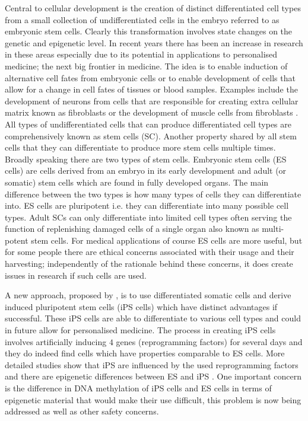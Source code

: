 Central to cellular development is the creation of distinct differentiated cell types from a small collection of undifferentiated cells in the embryo referred to as embryonic stem cells. Clearly this transformation involves state changes on the genetic and epigenetic level. In recent years there has been an increase in research in these areas especially due to its potential in applications to personalised medicine; the next big frontier in medicine. The idea is to enable induction of alternative cell fates from embryonic cells or to enable development of cells that allow for a change in cell fates of tissues or blood samples. Examples include the development of neurons from cells that are responsible for creating extra cellular matrix known as fibroblasts \citep{Vierbuchen:2010fa, Pang:2011ce} or the development of muscle cells from fibroblasts \citep{Ieda:2010ir, Efe:2011bpa}. All types of undifferentiated cells that can produce differentiated cell types are comprehensively known as stem cells (SC). Another property shared by all stem cells that they can differentiate to produce more stem cells multiple times. Broadly speaking there are two types of stem cells. Embryonic stem cells (ES cells) are cells derived from an embryo in its early development and  adult (or somatic) stem cells which are found in fully developed organs. The main difference between the two types is how many types of cells they can differentiate into. ES cells are pluripotent i.e. they can differentiate into many possible cell types. Adult SCs can only differentiate into limited cell types often serving the function of replenishing damaged cells of a single organ also known as multi-potent stem cells. For medical applications of course ES cells are more useful, but for some people there are ethical concerns associated with their usage and their harvesting; independently of the rationale behind these concerns, it does create issues in research if such cells are used.

A new approach, proposed by \cite{Takahashi:2006hi}, is to use differentiated somatic cells and derive induced pluripotent stem cells (iPS cells) which have distinct advantages if successful. These iPS cells are able to differentiate to various cell types and could in future allow for personalised medicine. The process in creating iPS cells involves artificially inducing $4$ genes (reprogramming factors) for several days and they do indeed find cells which have properties comparable to ES cells. More detailed studies show that iPS are influenced by the used reprogramming factors and there are epigenetic differences between ES and iPS \citep{Carey:2011bs, Bock:2011kx}. One important concern is the difference in DNA methylation of iPS cells and ES cells in terms of epigenetic material that would make their use difficult, this problem is now being addressed \citep{Bagci:2013ey} as well as other safety concerns.

